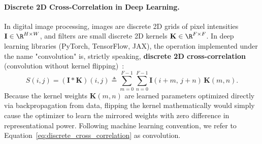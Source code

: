 \paragraph{Discrete 2D Cross-Correlation in Deep Learning.}
In digital image processing, images are discrete 2D grids of pixel intensities $\mathbf{I} \in \R^{H \times W}$, and filters are small discrete 2D kernels $\mathbf{K} \in \R^{F \times F}$. In deep learning libraries (PyTorch, TensorFlow, JAX), the operation implemented under the name "convolution" is, strictly speaking, \textbf{discrete 2D cross-correlation} (convolution without kernel flipping)~\cite{bishop2024deep,goodfellow2016deep}:
\begin{equation}
S(i, j) = (\mathbf{I} * \mathbf{K})(i, j) \triangleq \sum_{m=0}^{F-1} \sum_{n=0}^{F-1} \mathbf{I}(i + m, \, j + n) \, \mathbf{K}(m, n).
\label{eq:discrete_cross_correlation}
\end{equation}
Because the kernel weights $\mathbf{K}(m, n)$ are learned parameters optimized directly via backpropagation from data, flipping the kernel mathematically would simply cause the optimizer to learn the mirrored weights with zero difference in representational power. Following machine learning convention, we refer to Equation~\eqref{eq:discrete_cross_correlation} as convolution.

